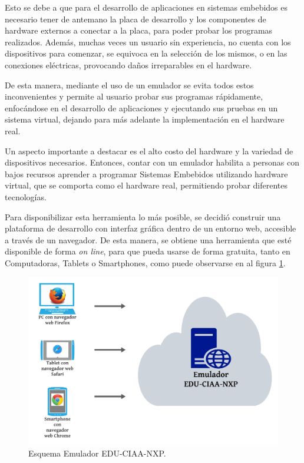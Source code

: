 Esto se debe a que para el desarrollo de aplicaciones en sistemas embebidos es necesario tener de antemano la placa de desarrollo y los componentes de hardware externos a conectar a la placa, para poder probar los programas realizados. Además, muchas veces un usuario sin experiencia, no cuenta con los dispositivos para comenzar, se equivoca en la selección de los mismos, o en las conexiones eléctricas, provocando daños irreparables en el hardware. 

De esta manera, mediante el uso de un emulador se evita todos estos inconvenientes y permite al usuario probar sus programas rápidamente, enfocándose en el desarrollo de aplicaciones y ejecutando sus pruebas en un sistema virtual, dejando para más adelante la implementación en el hardware real.

Un aspecto importante a destacar es el alto costo del hardware y la variedad de dispositivos necesarios. Entonces, contar con un emulador habilita a personas con bajos recursos aprender a programar Sistemas Embebidos utilizando hardware virtual, que se comporta como el hardware real, permitiendo probar diferentes tecnologías.

Para disponibilizar esta herramienta lo más posible, se decidió construir una plataforma de desarrollo con interfaz gráfica dentro de un entorno web, accesible a través de un navegador. De esta manera, se obtiene una herramienta que esté disponible de forma \textit{on line}, para que pueda usarse de forma gratuita, tanto en Computadoras, Tablets o Smartphones, como puede observarse en al figura \ref{fig:EsquemaEmulador}.

\begin{figure}[ht]
	\centering
	\includegraphics[scale=.55]{./Figures/EsquemaEmuladorCh1.png}
	\caption{Esquema Emulador EDU-CIAA-NXP.}
	\label{fig:EsquemaEmulador}
\end{figure}

